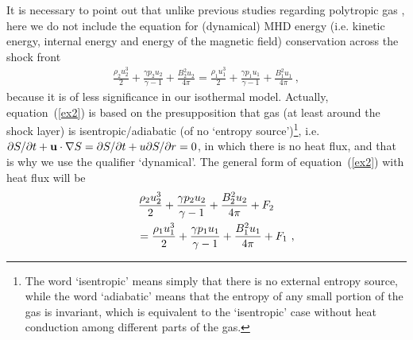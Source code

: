 \documentclass[fleqn,usenatbib]{mnras}
\begin{document}
It is necessary to point out that unlike previous studies regarding polytropic gas \citep{lou2006self,wang2008dynamic},  here we do not include the equation for (dynamical) MHD energy (i.e. kinetic energy, internal energy and energy of the magnetic field) conservation across the shock front 
\begin{gather}
\frac{\rho_{2} u_{2}^{3}}{2}+\frac{\gamma p_{2} u_{2}}{\gamma-1}+\frac{B_{2}^{2}u_{2}}{4\pi}=\frac{\rho_{1} u_{1}^{3}}{2}+\frac{\gamma p_{1} u_{1}}{\gamma-1}+\frac{B_{1}^{2}u_{1}}{4\pi}\ ,\label{ex2}
\end{gather}
because it is of less significance in our isothermal model. Actually, equation~(\ref{ex2}) is based on the presupposition that gas (at least around the shock layer) is isentropic/adiabatic (of no `entropy source')\footnote{The word `isentropic' means simply that there is no external entropy source, while the word `adiabatic' means that the entropy of any small portion of the gas is invariant, which is equivalent to the `isentropic' case without heat conduction among different parts of the gas.}, i.e. $\partial S/\partial t+{\bf{u}} \cdot\nabla S=\partial S/\partial t+u\partial S/\partial r=0$, in which there is no heat flux, and that is why we use the qualifier `dynamical'. The general form of equation~(\ref{ex2}) with heat flux will be 
\begin{gather}
\frac{\rho_{2} u_{2}^{3}}{2}+\frac{\gamma p_{2} u_{2}}{\gamma-1}+\frac{B_{2}^{2}u_{2}}{4\pi}+F_{2}\notag\\
\qquad=\frac{\rho_{1} u_{1}^{3}}{2}+\frac{\gamma p_{1} u_{1}}{\gamma-1}+\frac{B_{1}^{2}u_{1}}{4\pi}+F_{1}\ ,\label{ex4} 
\end{gather}
\end{document}
